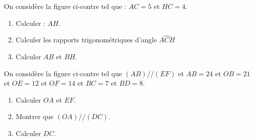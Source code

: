 \documentclass[a4paper,12pt]{article}
\begin{document}
\begin{exo}
\begin{minipage}{0.6\linewidth}
 On considère la figure ci-contre tel que : $AC=5$  et $HC=4$.
\begin{enumerate}
\item Calculer : $AH$.
\item Calculer les rapports trigonométriques d'angle $\widehat{ACH}$
\item Calculer $AB$ et $BH$.
\end{enumerate}
\end{minipage}
\begin{minipage}{0.4\linewidth}
\end{minipage}
\end{exo}

\begin{exo}
\begin{minipage}{.6\linewidth}
On considère la figure ci-contre tel que $(AB)//(EF)$ et $AB=24$ et $OB=21$ et $OE=12$ et $OF=14$ et $BC=7$ et $BD=8$.
\begin{enumerate}
\item Calculer $OA$ et $EF$.
\item Montrer que $(OA)//(DC)$.
\item Calculer $DC$.
\end{enumerate}
\end{minipage}%
\begin{minipage}{.4\linewidth}
\end{minipage}
\end{exo}
\end{document}
